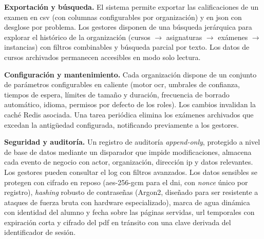 \begin{functional}
  \item \textbf{Exportación y búsqueda.}
  \label{rf:export}
  El sistema permite exportar las calificaciones de un examen en
  \acs{csv} (con columnas configurables por organización) y en
  \acs{json} con desglose por problema. Los gestores disponen de una
  búsqueda jerárquica para explorar el histórico de la organización
  (cursos $\to$ asignaturas $\to$ exámenes $\to$ instancias) con
  filtros combinables y búsqueda parcial por texto. Los datos de cursos
  archivados permanecen accesibles en modo solo lectura.

  \item \textbf{Configuración y mantenimiento.}
  \label{rf:config}
  Cada organización dispone de un conjunto de parámetros configurables
  en caliente (motor \acs{ocr}, umbrales de confianza, tiempos de
  espera, límites de tamaño y duración, frecuencia de borrado
  automático, idioma, permisos por defecto de los roles). Los cambios
  invalidan la caché Redis asociada. Una tarea periódica elimina los
  exámenes archivados que excedan la antigüedad configurada, notificando
  previamente a los gestores.

  \item \textbf{Seguridad y auditoría.}
  \label{rf:security}
  Un registro de auditoría \textit{append-only}, protegido a nivel de
  base de datos mediante un disparador que impide modificaciones,
  almacena cada evento de negocio con actor, organización, dirección
  \acs{ip} y datos relevantes. Los gestores pueden consultar el log con
  filtros avanzados. Los datos sensibles se protegen con cifrado en
  reposo (\acs{aes}-256-\acs{gcm} para el \acs{dni}, con \textit{nonce}
  único por registro), \textit{hashing} robusto de contraseñas (Argon2,
  diseñado para ser resistente a ataques de fuerza bruta con hardware
  especializado), marca de agua dinámica con identidad del alumno y
  fecha sobre las páginas servidas, \acs{url} temporales con expiración
  corta y cifrado del \acs{pdf} en tránsito con una clave derivada del
  identificador de sesión.

\end{functional}
